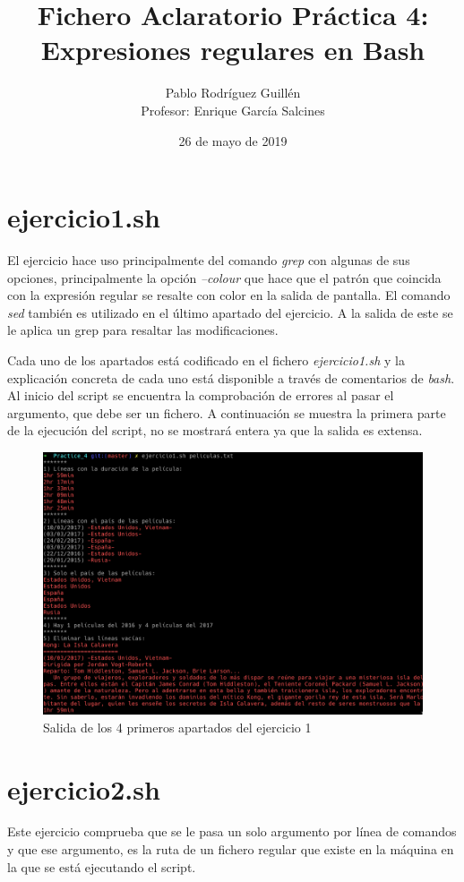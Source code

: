 \documentclass[12pt,a4paper]{article}
\author{Pablo Rodríguez Guillén \\ Profesor: Enrique García Salcines}
\title{\textbf{Fichero Aclaratorio Práctica 4: Expresiones regulares en Bash}}
\date{26 de mayo de 2019}
\begin{document}
\maketitle
\tableofcontents
\newpage

\section{ejercicio1.sh}
El ejercicio hace uso principalmente del comando \emph{grep} con algunas de sus opciones, principalmente la opción \emph{--colour} que hace que el patrón que coincida con la expresión regular se resalte con color en la salida de pantalla. El comando \emph{sed} también es utilizado en el último apartado del ejercicio. A la salida de este se le aplica un grep para resaltar las modificaciones.

Cada uno de los apartados está codificado en el fichero \emph{ejercicio1.sh} y la explicación concreta de cada uno está disponible a través de comentarios de \emph{bash}. Al inicio del script se encuentra la comprobación de errores al pasar el argumento, que debe ser un fichero. A continuación se muestra la primera parte de la ejecución del script, no se mostrará entera ya que la salida es extensa.

\begin{figure}[ht]
	\centering
	\includegraphics[width=1\textwidth]{images/ejercicio1.png}
	\caption{Salida de los 4 primeros apartados del ejercicio 1}
\end{figure}

\newpage

\section{ejercicio2.sh}
Este ejercicio comprueba que se le pasa un solo argumento por línea de comandos y que ese argumento, es la ruta de un fichero regular que existe en la máquina en la que se está ejecutando el script.
\end{document}
